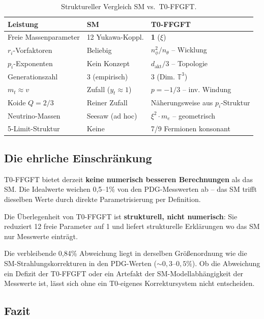 \begin{table}[htbp]
\centering\footnotesize
\begin{tabular}{lll}
\toprule
\textbf{Leistung} & \textbf{SM} & \textbf{T0-FFGFT} \\
\midrule
Freie Massenparameter & 12 Yukawa-Koppl. & \textbf{1} ($\xi$) \\
$r_i$-Vorfaktoren & Beliebig & $n_\phi^2/n_\theta$ -- Wicklung \\
$p_i$-Exponenten & Kein Konzept & $d_{\text{akt}}/3$ -- Topologie \\
Generationszahl & 3 (empirisch) & 3 (Dim. $\mathbb{T}^3$) \\
$m_t \approx v$ & Zufall ($y_t \approx 1$) & $p=-1/3$ -- inv. Windung \\
Koide $Q=2/3$ & Reiner Zufall & Näherungsweise aus $p_i$-Struktur \\
Neutrino-Massen & Seesaw (ad hoc) & $\xi^2 \cdot m_e$ -- geometrisch \\
5-Limit-Struktur & Keine & 7/9 Fermionen konsonant \\
\bottomrule
\end{tabular}
\caption{Struktureller Vergleich SM vs.\ T0-FFGFT.}
\label{tab:sm_vergleich}
\end{table}

\subsection{Die ehrliche Einschränkung}

\begin{warnbox}
T0-FFGFT bietet derzeit \textbf{keine numerisch besseren Berechnungen}
als das SM. Die Idealwerte weichen 0{,}5--1\% von den PDG-Messwerten
ab -- das SM trifft dieselben Werte durch direkte Parametrisierung
per Definition.

Die Überlegenheit von T0-FFGFT ist \textbf{strukturell, nicht numerisch}:
Sie reduziert 12 freie Parameter auf 1 und liefert strukturelle
Erklärungen wo das SM nur Messwerte einträgt.
\end{warnbox}

Die verbleibende 0{,}84\% Abweichung liegt in derselben Größenordnung
wie die SM-Strahlungskorrekturen in den PDG-Werten ($\sim 0{,}3$--$0{,}5\%$).
Ob die Abweichung ein Defizit der T0-FFGFT oder ein Artefakt der
SM-Modellabhängigkeit der Messwerte ist, lässt sich ohne ein
T0-eigenes Korrektursystem nicht entscheiden.

\subsection{Fazit}


